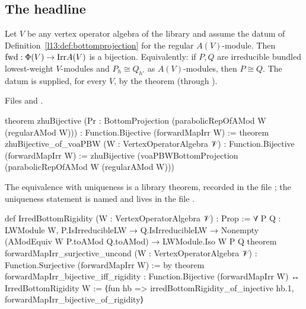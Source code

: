 \subsection{The headline}

\begin{theorem}\label{l13:thm:headline}
Let $V$ be any vertex operator algebra of the library and assume the datum  of
Definition~\ref{l13:def:bottomprojection} for the regular $A(V)$-module. Then $\mathrm{fwd}:\Phi(V)\to\mathrm{Irr} A(V)$
is a bijection. Equivalently: if $P,Q$ are irreducible bundled lowest-weight $V$-modules and $P_h\cong Q_{h'}$ as
$A(V)$-modules, then $P\cong Q$. The datum  is supplied, for every $V$, by the theorem  (through ).
\end{theorem}
\noindent Files  and
.
\begin{leancode}
theorem zhuBijective (Pr : BottomProjection (parabolicRepOfAMod W (regularAMod W))) :
    Function.Bijective (forwardMapIrr W) :=
theorem zhuBijective_of_voaPBW (W : VertexOperatorAlgebra 𝒱) :
    Function.Bijective (forwardMapIrr W) :=
  zhuBijective
    (voaPBWBottomProjection (parabolicRepOfAMod W (regularAMod W)))
\end{leancode}
\noindent The equivalence with uniqueness is a library theorem, recorded in the file
; the uniqueness statement is named
 and lives in the file .
\begin{leancode}
def IrredBottomRigidity (W : VertexOperatorAlgebra 𝒱) : Prop :=
  ∀ P Q : LWModule W, P.IsIrreducibleLW → Q.IsIrreducibleLW →
    Nonempty (AModEquiv W P.toAMod Q.toAMod) → LWModule.Iso W P Q
theorem forwardMapIrr_surjective_uncond (W : VertexOperatorAlgebra 𝒱) :
    Function.Surjective (forwardMapIrr W) := by
theorem forwardMapIrr_bijective_iff_rigidity :
    Function.Bijective (forwardMapIrr W) ↔ IrredBottomRigidity W :=
  ⟨fun hb => irredBottomRigidity_of_injective hb.1, forwardMapIrr_bijective_of_rigidity⟩
\end{leancode}

